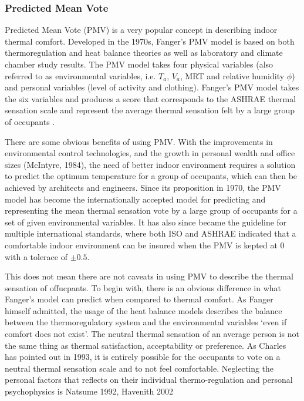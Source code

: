 \subsubsection{Predicted Mean Vote}
        Predicted Mean Vote (PMV) is a very popular concept in describing indoor thermal comfort. Developed in the 1970s, Fanger's  PMV model is based on both thermoregulation and heat balance theories as well as laboratory and climate chamber study results. The PMV model takes four physical variables (also referred to as environmental variables, i.e. $T_a$, $V_a$, MRT and relative humidity $\phi$) and personal variables (level of activity and clothing). Fanger's PMV model takes the six variables and produces a score that corresponds to the ASHRAE thermal sensation scale and represent the average thermal sensation felt by a large group of occupants \cite{ashrae_thermal_2003,fanger_thermal_1970}.

        There are some obvious benefits of using PMV. With the improvements in environmental control technologies, and the growth in personal wealth and office sizes (McIntyre, 1984), the need of better indoor environment requires a solution to predict the optimum temperature for a group of occupants, which can then be achieved by architects and engineers. Since its proposition in 1970, the PMV model has become the internationally accepted model for predicting and representing the mean thermal sensation vote by a large group of occupants for a set of given environmental variables. It has also since became the guideline for multiple international standards, where both ISO and ASHRAE indicated that a comfortable indoor environment can be insured when the PMV is kepted at 0 with a tolerace of $\pm0.5$.

        This does not mean there are not caveats in using PMV to describe the thermal sensation of offucpants. To begin with, there is an obvious difference in what Fanger's model can predict when compared to thermal comfort. As Fanger himself admitted, the usage of the heat balance models describes the balance between the thermoregulatory system and the environmental variables `even if comfort does not exist'. The neutral thermal sensation of an average person is not the same thing as thermal satisfaction, acceptability or preference. As Charles has pointed out in 1993, it is entirely possible for the occupants to vote on a neutral thermal sensation scale and to not feel comfortable.
        Neglecting the personal factors that reflects on their individual thermo-regulation and personal psychophysics is Natsume 1992, Havenith 2002

